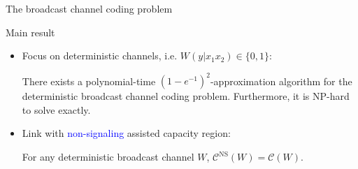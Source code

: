\documentclass{beamer}
\theoremstyle{definition}
\theoremstyle{remark}
\begin{document}
\begin{frame}{The broadcast channel coding problem}
\begin{itemize}
{\begin{center}
    \end{center}}
  \end{itemize}
\end{frame}

\begin{frame}{Main result}
  \begin{itemize}
    \item Focus on \alert{deterministic} channels, i.e. $W(y|x_1x_2) \in \{0,1\}$:
  \begin{theorem} 
  There exists a polynomial-time $(1-e^{-1})^2$-approximation algorithm for the deterministic broadcast channel coding problem. Furthermore, it is \textrm{NP}-hard to solve exactly.
  \end{theorem}
  \pause
  \bigskip
\item Link with \textcolor{blue}{non-signaling} assisted capacity region:
  \begin{corollary}
  For any deterministic broadcast channel $W$, $\mathcal{C}^{\mathrm{NS}}(W)=\mathcal{C}(W)$.
  \end{corollary}
  \end{itemize}
\end{frame}
\end{document}
